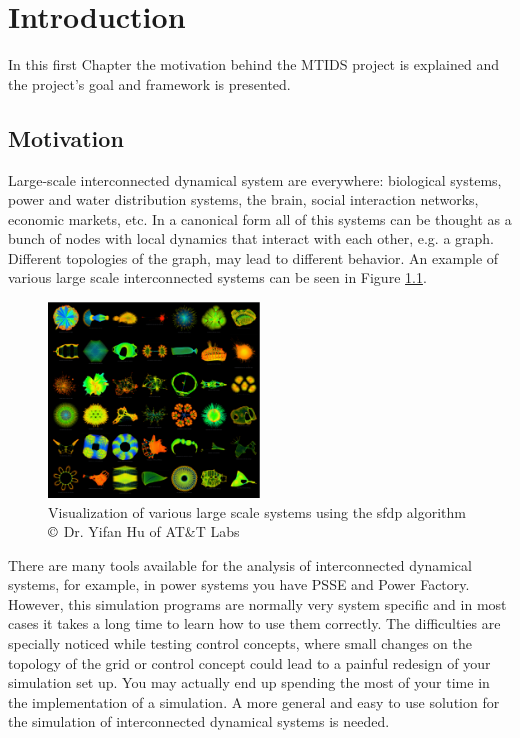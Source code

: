 \documentclass[a4paper,twoside, openright,12pt]{report}
\begin{document}
\pagestyle{fancy}

\tableofcontents 




\chapter{Introduction} \label{chapter1}

In this first Chapter the motivation behind the MTIDS project is explained and the project's goal and framework is presented.

\section{Motivation}
Large-scale interconnected dynamical system are everywhere: biological systems, power and water distribution systems, the brain, 
social interaction networks, economic markets, etc. In a canonical form all of this systems can be thought as a bunch of nodes with local dynamics 
that interact with each other, e.g. a graph. Different topologies of the graph, may lead to different behavior. An example of various 
large scale interconnected systems can be seen in Figure \ref{largePic}. 


\begin{figure}[htb]
\centering
\includegraphics[width=0.5\textwidth]{pics/complex.eps}
\caption[Example of large-scale systems]{Visualization of various large scale systems using the sfdp algorithm $\copyright$ Dr. Yifan Hu of AT\&T Labs}
\label{largePic}
\end{figure}

There are many tools available for the analysis of interconnected dynamical systems, for example, in power systems you have PSSE and Power Factory. However,
this simulation programs are normally very system specific and in most cases it takes a long time to learn how to use them correctly. 
The difficulties are specially noticed while
testing control concepts, where small changes on the topology of the grid or control concept could lead to a painful redesign of your simulation set up. 
You may actually end up spending the most of your time in the implementation of a simulation. A more general and 
easy to use solution for the simulation of interconnected dynamical systems is needed.
\end{document}
